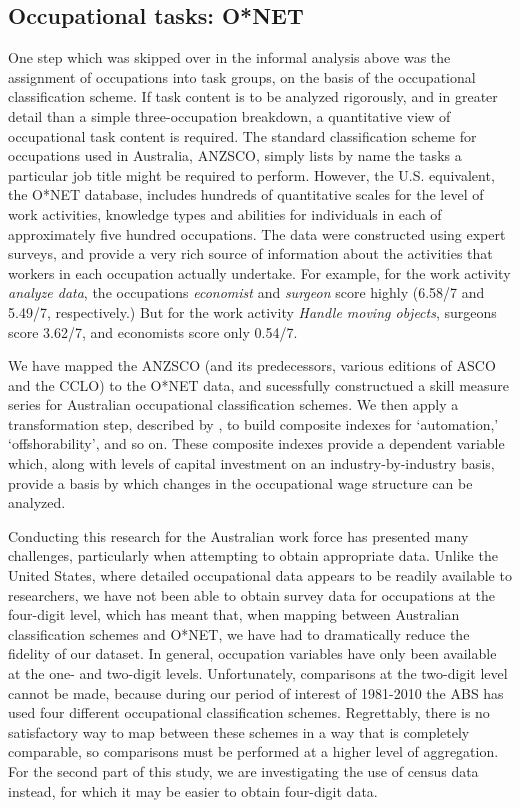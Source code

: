 \message{ !name(paper.tex)}\documentclass[a4paper,11pt]{report}
\numberwithin{equation}{chapter}
\begin{document}
\subsection{Occupational tasks: O*NET}

One step which was skipped over in the informal analysis above was the assignment of occupations into task groups, on the basis of the occupational classification scheme. If task content is to be analyzed rigorously, and in greater detail than a simple three-occupation breakdown, a quantitative view of occupational task content is required. The standard classification scheme for occupations used in Australia, ANZSCO, simply lists by name the tasks a particular job title might be required to perform. However, the U.S. equivalent, the O*NET database, includes hundreds of quantitative scales for the level of work activities, knowledge types and abilities for individuals in each of approximately five hundred occupations. The data were constructed using expert surveys, and provide a very rich source of information about the activities that workers in each occupation actually undertake. For example, for the work activity {\em analyze data}, the occupations {\em economist} and {\em surgeon} score highly (6.58/7 and 5.49/7, respectively.) But for the work activity {\em Handle moving objects}, surgeons score 3.62/7, and economists score only 0.54/7.

We have mapped the ANZSCO (and its predecessors, various editions of ASCO and the CCLO) to the O*NET data, and sucessfully constructued a skill measure series for Australian occupational classification schemes. We then apply a transformation step, described by \citet{Firpo2011}, to build composite indexes for `automation,' `offshorability', and so on. These composite indexes provide a dependent variable which, along with levels of capital investment on an industry-by-industry basis, provide a basis by which changes in the occupational wage structure can be analyzed.

Conducting this research for the Australian work force has presented many challenges, particularly when attempting to obtain appropriate data. Unlike the United States, where detailed occupational data appears to be readily available to researchers, we have not been able to obtain survey data for occupations at the four-digit level, which has meant that, when mapping between Australian classification schemes and O*NET, we have had to dramatically reduce the fidelity of our dataset. In general, occupation variables have only been available at the one- and two-digit levels. Unfortunately, comparisons at the two-digit level cannot be made, because during our period of interest of 1981-2010 the ABS has used four different occupational classification schemes. Regrettably, there is no satisfactory way to map between these schemes in a way that is completely comparable, so comparisons must be performed at a higher level of aggregation. For the second part of this study, we are investigating the use of census data instead, for which it may be easier to obtain four-digit data. 
\end{document}
